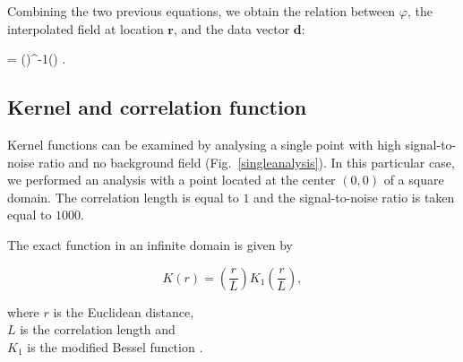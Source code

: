 Combining the two previous equations, we obtain the relation between $\varphi$, the interpolated field at location $\mathbf{r}$,  and the data vector $\mathbf{d}$:

\be
\boldsymbol{\varphi} = ()^{-1}() .
\label{eq:solution2}
\ee


\subsection{Kernel and correlation function \label{sec:kernel}}

Kernel functions  can be examined by analysing a single point with high signal-to-noise ratio and no background field (Fig.~\ref{singleanalysis}). In this particular case, we performed an analysis with a point located at the center $(0,0)$ of a square domain. The correlation length is equal to $1$ and the signal-to-noise ratio is taken equal to $1000$.

The exact function in an infinite domain is given by 

\begin{equation}
K(r)=\left(\frac{r}{L}\right)K_{1}\left(\frac{r}{L}\right),
\label{kernelfunction}
\end{equation}

where $r$ is the Euclidean distance,\\ 
\hphantom{where} $L$ is the correlation length and \\
\hphantom{where} $K_{1}$ is the modified Bessel function \citep[][page 359]{ABRAMOWITZ64}.

%
%
%
%
%
%
%


